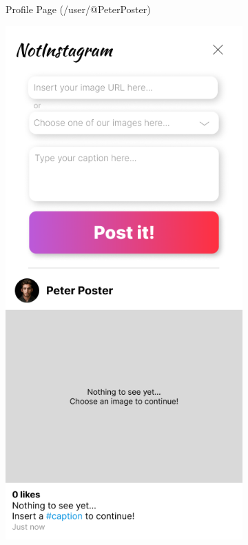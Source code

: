 \documentclass[a4paper, 12pt]{article}
\begin{document}
\begin{figure}[ht!]
\begin{subfigure}{0.49\linewidth}
\begin{center}
    \end{center}
    \caption{Profile Page (/user/@PeterPoster)}\label{subfig:user}
  \end{subfigure}
  \begin{subfigure}{0.49\linewidth}
    \begin{center}
      \includegraphics[width=\linewidth, height=0.3\textheight, keepaspectratio,frame]{img/ig-clone/Beitrag erstellen.png}

\end{center}
\end{subfigure}
\end{figure}
\end{document}
